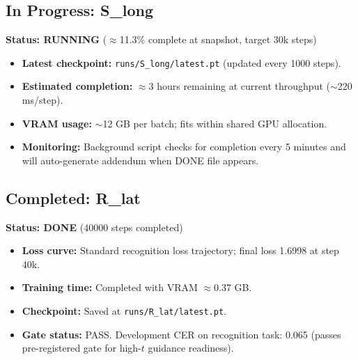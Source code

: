\documentclass[10.5pt,a4paper]{article}
\newcommand{\fp}[1]{\nolinkurl{#1}}
\begin{document}
\subsection{In Progress: S\_long}
\textbf{Status: RUNNING} ($\approx$11.3\% complete at snapshot, target 30k steps)
\begin{itemize}
\item \textbf{Latest checkpoint:} \fp{runs/S\_long/latest.pt} (updated every 1000 steps).
\item \textbf{Estimated completion:} $\approx$3 hours remaining at current throughput ($\sim$220 ms/step).
\item \textbf{VRAM usage:} $\sim$12 GB per batch; fits within shared GPU allocation.
\item \textbf{Monitoring:} Background script checks for completion every 5 minutes and will auto-generate addendum when DONE file appears.
\end{itemize}

\subsection{Completed: R\_lat}
\textbf{Status: DONE} (40000 steps completed)
\begin{itemize}
\item \textbf{Loss curve:} Standard recognition loss trajectory; final loss 1.6998 at step 40k.
\item \textbf{Training time:} Completed with VRAM $\approx$0.37 GB.
\item \textbf{Checkpoint:} Saved at \fp{runs/R_lat/latest.pt}.
\item \textbf{Gate status:} PASS. Development CER on recognition task: 0.065 (passes pre-registered gate for high-$t$ guidance readiness).
\end{itemize}
\end{document}
